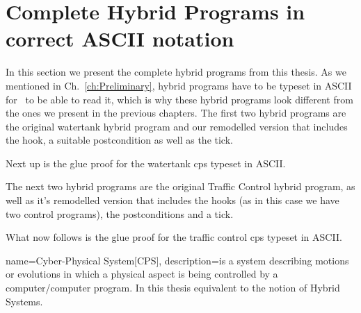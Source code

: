 \section{Complete Hybrid Programs in correct ASCII notation}
\label{app:sec:pdfs}

In this section we present the complete hybrid programs from this thesis. As we mentioned in Ch.~\ref{ch:Preliminary}, hybrid programs have to be typeset in ASCII for \keym~to be able to read it, which is why these hybrid programs look different from the ones we present in the previous chapters. The first two hybrid programs are the original watertank hybrid program and our remodelled version that includes the hook, a suitable postcondition as well as the tick.




Next up is the glue proof for the watertank cps typeset in ASCII.



The next two hybrid programs are the original Traffic Control hybrid program, as well as it's remodelled version that includes the hooks (as in this case we have two control programs), the postconditions and a tick.




What now follows is the glue proof for the traffic control cps typeset in ASCII.





 {
 name=Cyber-Physical System[CPS],
 description={is a system describing motions or evolutions in which a physical aspect is being controlled by a computer/computer program. In this thesis equivalent to the notion of Hybrid Systems.}
}


